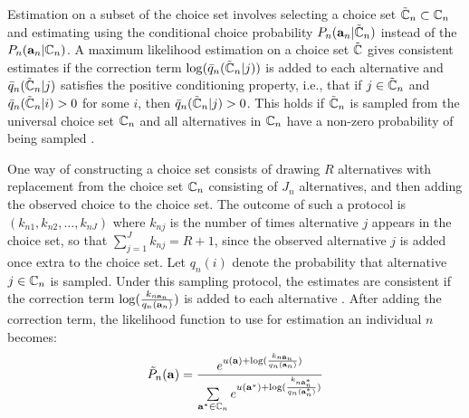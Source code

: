 Estimation on a subset of the choice set involves selecting a choice set $\tilde{\mathbb{C}}_n \subset \mathbb{C}_n$ and estimating using the conditional choice probability $P_n({\bf a}_n|\tilde{\mathbb{C}}_n)$ instead of the $P_n({\bf a}_n|\mathbb{C}_n)$. A maximum likelihood estimation on a choice set $\tilde{\mathbb{C}}$ gives consistent estimates if the correction term $\log(\bar{q}_n(\tilde{\mathbb{C}}_n|j))$ is added to each alternative and $\bar{q}_n(\tilde{\mathbb{C}}_n|j)$ satisfies the positive conditioning property, i.e., that if $j\in \tilde{\mathbb{C}}_n$ and $\bar{q}_n(\tilde{\mathbb{C}}_n|i)>0$ for some $i$, then $\bar{q}_n(\tilde{\mathbb{C}}_n|j)>0$. This holds if $\tilde{\mathbb{C}}_n$ is sampled from the universal choice set $\mathbb{C}_n$ and all alternatives in $\mathbb{C}_n$ have a non-zero probability of being sampled \citep{mcfadden78}. 

One way of constructing a choice set consists of drawing $R$ alternatives with replacement from the choice set $\mathbb{C}_n$ consisting of $J_n$ alternatives, and then adding the observed choice to the choice set. The outcome of such a protocol is $({k}_{n1},{k}_{n2},\dots,{k}_{nJ})$ where ${k}_{nj}$ is the number of times alternative $j$ appears in the choice set, so that $\sum_{j=1}^J {k}_{nj} = R+1$, since the observed alternative $j$ is added once extra to the choice set. Let $q_n(i)$ denote the probability that alternative $j \in \mathbb{C}_n$ is sampled. Under this sampling protocol, the estimates are consistent if the correction term $\log(\frac{k_{n{\bf a}_n}}{q_n({\bf a}_n)})$ is added to each alternative \citep{frejinger09}. After adding the correction term, the likelihood function to use for estimation an individual $n$ becomes:
\begin{equation} \label{eq:cond_like_corr}
\tilde{P}_n(\ve{a}) = \frac{e^{u(\ve{a}) + \log(\frac{k_{n\ve{a}_n}}{q_n(\ve{a}_n)})}}{\sum\limits_{\ve{a}^* \in \Cc_n} e^{u(\ve{a}^*) + \log(\frac{k_{n\ve{a}^*_n}}{q_n(\ve{a}^*_n)})}}
\end{equation}

